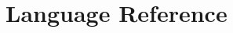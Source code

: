 \documentclass[main.tex]{subfiles}
\begin{document}
\onlyinsubfile{\mainmatter{}\appendix{}}

\chapter{Language Reference}
\label{ch:grammar}

\biblio{}
\onlyinsubfile{\glsaddall\printglossaries}
\end{document}

